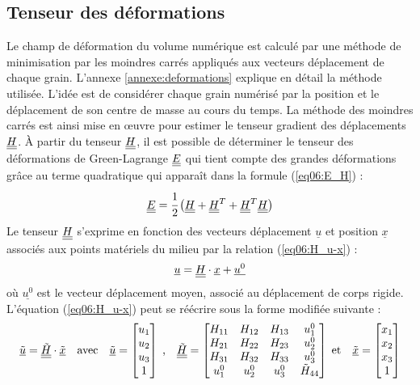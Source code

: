 	\subsection{Tenseur des déformations}\label{para06:green_lagrange}
		Le champ de déformation du volume numérique est calculé par une méthode de minimisation par les moindres carrés appliqués aux vecteurs déplacement de chaque grain. L'annexe \ref{annexe:deformations} explique en détail la méthode utilisée. L'idée est de considérer chaque grain numérisé par la position et le déplacement de son centre de masse au cours du temps. La méthode des moindres carrés est ainsi mise en \oe{}uvre pour estimer le tenseur gradient des déplacements $\underline{\underline{H}}$. \`A partir du tenseur $\underline{\underline{H}}$, il est possible de déterminer le tenseur des déformations de Green-Lagrange $\underline{\underline{E}}$ qui tient compte des grandes déformations grâce au terme quadratique qui apparaît dans la formule (\ref{eq06:E_H}) :
		\begin{equation}\label{eq06:E_H}
			\underline{\underline{E}}
			= \cfrac{1}{2}\left( \underline{\underline{H}} + \underline{\underline{H}}^T + \underline{\underline{H}}^T \underline{\underline{H}} \right)
		\end{equation}
		Le tenseur $\underline{\underline{H}}$ s'exprime en fonction des vecteurs déplacement $\underline{u}$ et position $\underline{x}$ associés aux points matériels du milieu par la relation (\ref{eq06:H_u-x}) :
		\begin{equation}\label{eq06:H_u-x}
			\underline{u}
			= \underline{\underline{H}} \cdot \underline{x} + \underline{u^0}
		\end{equation}
		où $\underline{u^0}$ est le vecteur déplacement moyen, associé au déplacement de corps rigide. L'équation (\ref{eq06:H_u-x}) peut se réécrire sous la forme modifiée suivante :
		\begin{equation}\label{eq06:H_u-x_modifie}
			\underline{\tilde{u}}
			= \underline{\underline{\tilde{H}}} \cdot \underline{\tilde{x}}
			\quad\text{avec}\quad
			\underline{\tilde{u}}
			= \begin{bmatrix}
			u_1\\u_2\\u_3\\1\end{bmatrix}
			\;\text{,}\quad
			\underline{\underline{\tilde{H}}}
			= \begin{bmatrix}
			H_{11} & H_{12} & H_{13} & u_1^0\\
			H_{21} & H_{22} & H_{23} & u_2^0\\
			H_{31} & H_{32} & H_{33} & u_3^0\\
			u_1^0 & u_2^0 & u_3^0 & \tilde{H}_{44}
			\end{bmatrix}
			\;\text{et}\quad
			\underline{\tilde{x}}
			= \begin{bmatrix}
			x_1\\x_2\\x_3\\1\end{bmatrix}
		\end{equation}
